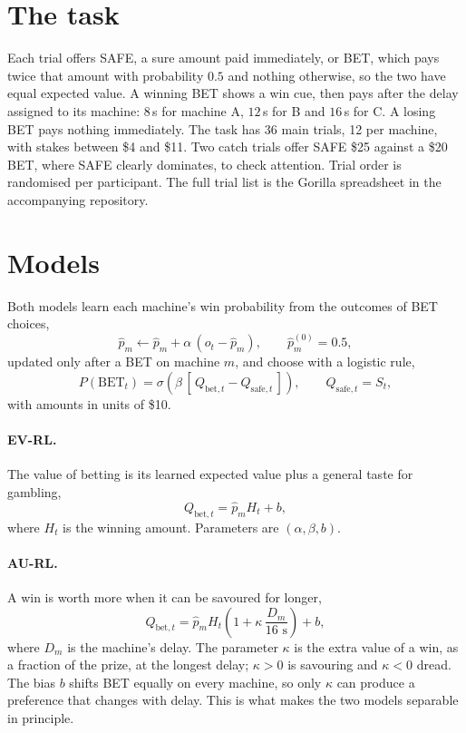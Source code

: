 \documentclass[10pt,twocolumn]{article}
\begin{document}
\section{The task}

Each trial offers SAFE, a sure amount paid immediately, or BET, which pays
twice that amount with probability $0.5$ and nothing otherwise, so the two have
equal expected value. A winning BET shows a win cue, then pays after the
delay assigned to its machine: $8$\,s for machine A, $12$\,s for B and $16$\,s
for C. A losing BET pays nothing immediately. The task has 36 main trials,
12 per machine, with stakes between \$4 and \$11. Two catch trials offer
SAFE \$25 against a \$20 BET, where SAFE clearly dominates, to check attention.
Trial order is randomised per participant. The full trial list is the Gorilla
spreadsheet in the accompanying repository.

\section{Models}

Both models learn each machine's win probability from the outcomes of BET
choices,
\begin{equation}
\hat p_m \leftarrow \hat p_m + \alpha\,(o_t - \hat p_m), \qquad \hat p_m^{(0)} = 0.5,
\end{equation}
updated only after a BET on machine $m$, and choose with a logistic rule,
\begin{equation}
P(\text{BET}_t) = \sigma\!\left(\beta\,[\,Q_{\text{bet},t} - Q_{\text{safe},t}\,]\right),
\qquad Q_{\text{safe},t} = S_t,
\end{equation}
with amounts in units of \$10.

\paragraph{EV-RL.} The value of betting is its learned expected value plus a
general taste for gambling,
\begin{equation}
Q_{\text{bet},t} = \hat p_m H_t + b,
\end{equation}
where $H_t$ is the winning amount. Parameters are $(\alpha, \beta, b)$.

\paragraph{AU-RL.} A win is worth more when it can be savoured for longer,
\begin{equation}
Q_{\text{bet},t} = \hat p_m H_t \left(1 + \kappa\,\frac{D_m}{16\text{ s}}\right) + b,
\end{equation}
where $D_m$ is the machine's delay. The parameter $\kappa$ is the extra value of
a win, as a fraction of the prize, at the longest delay; $\kappa > 0$ is
savouring and $\kappa < 0$ dread. The bias $b$ shifts BET equally on every
machine, so only $\kappa$ can produce a preference that changes with delay.
This is what makes the two models separable in principle.
\end{document}
